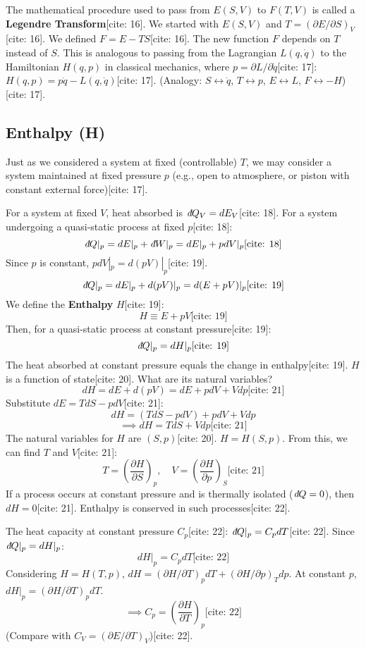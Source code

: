 \documentclass[11pt]{article}
\newcommand{\pderiv}[2]{\frac{\partial #1}{\partial #2}}
\newcommand{\ethbar}{\text{\it{đ}}} %
\begin{document}
The mathematical procedure used to pass from $E(S,V)$ to $F(T,V)$ is called a \textbf{Legendre Transform}[cite: 16].
We started with $E(S,V)$ and $T = (\partial E / \partial S)_V$[cite: 16].
We defined $F = E - TS$[cite: 16]. The new function $F$ depends on $T$ instead of $S$.
This is analogous to passing from the Lagrangian $L(q, \dot{q})$ to the Hamiltonian $H(q,p)$ in classical mechanics, where $p = \partial L / \partial \dot{q}$[cite: 17]:
$H(q,p) = p \dot{q} - L(q, \dot{q})$[cite: 17].
(Analogy: $S \leftrightarrow \dot{q}$, $T \leftrightarrow p$, $E \leftrightarrow L$, $F \leftrightarrow -H$)[cite: 17].

\subsection*{Enthalpy (H)} %

Just as we considered a system at fixed (controllable) $T$, we may consider a system maintained at fixed pressure $p$ (e.g., open to atmosphere, or piston with constant external force)[cite: 17].

For a system at fixed $V$, heat absorbed is $\ethbar Q_V = dE_V$[cite: 18].
For a system undergoing a quasi-static process at fixed $p$[cite: 18]:
\[ \ethbar Q |_p = dE |_p + \ethbar W |_p = dE |_p + p dV |_p \text{[cite: 18]} \]
Since $p$ is constant, $p dV|_p = d(pV)|_p$[cite: 19].
\[ \ethbar Q |_p = dE |_p + d(pV) |_p = d(E+pV)|_p \text{[cite: 19]} \]
We define the \textbf{Enthalpy} $H$[cite: 19]:
\[ H \equiv E + pV \text{[cite: 19]} \]
Then, for a quasi-static process at constant pressure[cite: 19]:
\[ \ethbar Q |_p = dH |_p \text{[cite: 19]} \]
The heat absorbed at constant pressure equals the change in enthalpy[cite: 19].
$H$ is a function of state[cite: 20]. What are its natural variables?
\[ dH = dE + d(pV) = dE + p dV + V dp \text{[cite: 21]} \]
Substitute $dE = T dS - p dV$[cite: 21]:
\[ dH = (T dS - p dV) + p dV + V dp \]
\[ \implies dH = T dS + V dp \text{[cite: 21]} \]
The natural variables for $H$ are $(S, p)$[cite: 20]. $H=H(S,p)$.
From this, we can find $T$ and $V$[cite: 21]:
\[ T = \left( \pderiv{H}{S} \right)_p, \quad V = \left( \pderiv{H}{p} \right)_S \text{[cite: 21]} \]
If a process occurs at constant pressure and is thermally isolated ($\ethbar Q=0$), then $dH=0$[cite: 21]. Enthalpy is conserved in such processes[cite: 22].

The heat capacity at constant pressure $C_p$[cite: 22]:
$\ethbar Q|_p = C_p dT$[cite: 22]. Since $\ethbar Q|_p = dH|_p$:
\[ dH|_p = C_p dT \text{[cite: 22]} \]
Considering $H=H(T,p)$, $dH = (\partial H / \partial T)_p dT + (\partial H / \partial p)_T dp$.
At constant $p$, $dH|_p = (\partial H / \partial T)_p dT$.
\[ \implies C_p = \left( \pderiv{H}{T} \right)_p \text{[cite: 22]} \]
(Compare with $C_V = (\partial E / \partial T)_V$)[cite: 22].
\end{document}

